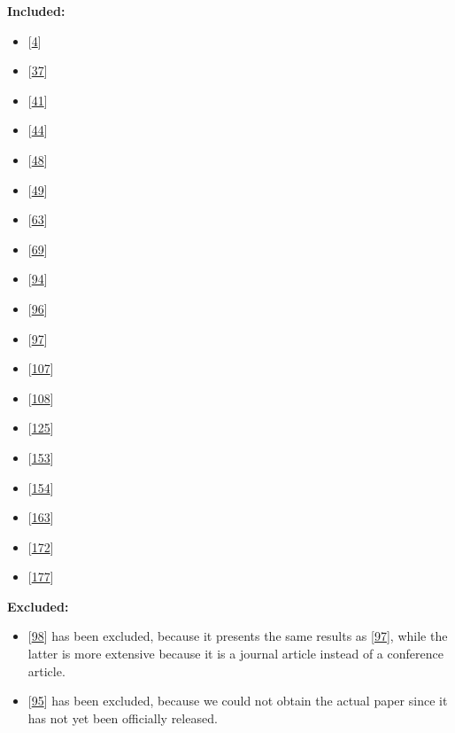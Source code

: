 \documentclass[]{book}
\providecommand{\tightlist}{%
  \setlength{\itemsep}{0pt}\setlength{\parskip}{0pt}}
\begin{document}
\textbf{Included:}

\begin{itemize}
\tightlist
\item
  {[}\protect\hyperlink{ref-adams2016a}{4}{]}
\item
  {[}\protect\hyperlink{ref-castelluccio2017a}{37}{]}
\item
  {[}\protect\hyperlink{ref-cesar2017a}{41}{]}
\item
  {[}\protect\hyperlink{ref-claes2017a}{44}{]}
\item
  {[}\protect\hyperlink{ref-da2014a}{48}{]}
\item
  {[}\protect\hyperlink{ref-da2016a}{49}{]}
\item
  {[}\protect\hyperlink{ref-dyck2015a}{63}{]}
\item
  {[}\protect\hyperlink{ref-fujibayashi2017a}{69}{]}
\item
  {[}\protect\hyperlink{ref-karvonen2017a}{94}{]}
\item
  {[}\protect\hyperlink{ref-kerzazi2013a}{96}{]}
\item
  {[}\protect\hyperlink{ref-khomh2015a}{97}{]}
\item
  {[}\protect\hyperlink{ref-laukkanen2017a}{107}{]}
\item
  {[}\protect\hyperlink{ref-laukkanen2018a}{108}{]}
\item
  {[}\protect\hyperlink{ref-mantyla2015a}{125}{]}
\item
  {[}\protect\hyperlink{ref-plewnia2014a}{153}{]}
\item
  {[}\protect\hyperlink{ref-poo-caamano2016a}{154}{]}
\item
  {[}\protect\hyperlink{ref-rodriguez2017a}{163}{]}
\item
  {[}\protect\hyperlink{ref-souza2015a}{172}{]}
\item
  {[}\protect\hyperlink{ref-teixeira2017a}{177}{]}
\end{itemize}

\textbf{Excluded:}

\begin{itemize}
\tightlist
\item
  {[}\protect\hyperlink{ref-khomh2012a}{98}{]} has been excluded,
  because it presents the same results as
  {[}\protect\hyperlink{ref-khomh2015a}{97}{]}, while the latter is more
  extensive because it is a journal article instead of a conference
  article.
\item
  {[}\protect\hyperlink{ref-kaur2019a}{95}{]} has been excluded, because
  we could not obtain the actual paper since it has not yet been
  officially released.
\end{itemize}
\end{document}
